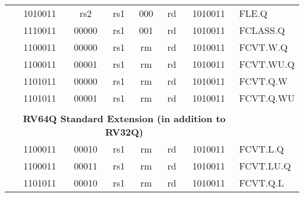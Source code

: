 \begin{table}[p]
\begin{small}
\begin{center}
\begin{tabular}{p{0in}p{0.4in}p{0.05in}p{0.05in}p{0.05in}p{0.05in}p{0.4in}p{0.6in}p{0.4in}p{0.6in}p{0.7in}l}
&
\multicolumn{4}{|c|}{1010011} &
\multicolumn{2}{c|}{rs2} &
\multicolumn{1}{c|}{rs1} &
\multicolumn{1}{c|}{000} &
\multicolumn{1}{c|}{rd} &
\multicolumn{1}{c|}{1010011} & FLE.Q \\
\cline{2-11}
  

&
\multicolumn{4}{|c|}{1110011} &
\multicolumn{2}{c|}{00000} &
\multicolumn{1}{c|}{rs1} &
\multicolumn{1}{c|}{001} &
\multicolumn{1}{c|}{rd} &
\multicolumn{1}{c|}{1010011} & FCLASS.Q \\
\cline{2-11}
  

&
\multicolumn{4}{|c|}{1100011} &
\multicolumn{2}{c|}{00000} &
\multicolumn{1}{c|}{rs1} &
\multicolumn{1}{c|}{rm} &
\multicolumn{1}{c|}{rd} &
\multicolumn{1}{c|}{1010011} & FCVT.W.Q \\
\cline{2-11}
  

&
\multicolumn{4}{|c|}{1100011} &
\multicolumn{2}{c|}{00001} &
\multicolumn{1}{c|}{rs1} &
\multicolumn{1}{c|}{rm} &
\multicolumn{1}{c|}{rd} &
\multicolumn{1}{c|}{1010011} & FCVT.WU.Q \\
\cline{2-11}
  

&
\multicolumn{4}{|c|}{1101011} &
\multicolumn{2}{c|}{00000} &
\multicolumn{1}{c|}{rs1} &
\multicolumn{1}{c|}{rm} &
\multicolumn{1}{c|}{rd} &
\multicolumn{1}{c|}{1010011} & FCVT.Q.W \\
\cline{2-11}
  

&
\multicolumn{4}{|c|}{1101011} &
\multicolumn{2}{c|}{00001} &
\multicolumn{1}{c|}{rs1} &
\multicolumn{1}{c|}{rm} &
\multicolumn{1}{c|}{rd} &
\multicolumn{1}{c|}{1010011} & FCVT.Q.WU \\
\cline{2-11}
  

&
\multicolumn{10}{c}{} & \\
&
\multicolumn{10}{c}{\bf RV64Q Standard Extension (in addition to RV32Q)} & \\
\cline{2-11}
  

&
\multicolumn{4}{|c|}{1100011} &
\multicolumn{2}{c|}{00010} &
\multicolumn{1}{c|}{rs1} &
\multicolumn{1}{c|}{rm} &
\multicolumn{1}{c|}{rd} &
\multicolumn{1}{c|}{1010011} & FCVT.L.Q \\
\cline{2-11}
  

&
\multicolumn{4}{|c|}{1100011} &
\multicolumn{2}{c|}{00011} &
\multicolumn{1}{c|}{rs1} &
\multicolumn{1}{c|}{rm} &
\multicolumn{1}{c|}{rd} &
\multicolumn{1}{c|}{1010011} & FCVT.LU.Q \\
\cline{2-11}
  

&
\multicolumn{4}{|c|}{1101011} &
\multicolumn{2}{c|}{00010} &
\multicolumn{1}{c|}{rs1} &
\multicolumn{1}{c|}{rm} &
\multicolumn{1}{c|}{rd} &
\multicolumn{1}{c|}{1010011} & FCVT.Q.L \\
\cline{2-11}
  


\end{tabular}
\end{center}
\end{small}
\end{table}
